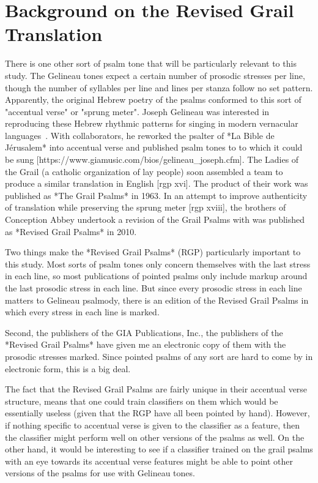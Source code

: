\documentclass[12pt]{proposal}
\begin{document}
\section{Background on the Revised Grail Translation}

There is one other sort of psalm tone that will be particularly relevant to this study.
The Gelineau tones expect a certain number of prosodic stresses per line, though the number of syllables per line and lines per stanza follow no set pattern.
Apparently, the original Hebrew poetry of the psalms conformed to this sort of "accentual verse" or "sprung meter".
Joseph Gelineau was interested in reproducing these Hebrew rhythmic patterns for singing in modern vernacular languages~\cite[p.xvi]{the_benedictine_monks_of_conception_abbey_revised_2010}.
With collaborators, he reworked the psalter of *La Bible de Jérusalem* into accentual verse and published psalm tones to to which it could be sung [https://www.giamusic.com/bios/gelineau_joseph.cfm].
The Ladies of the Grail (a catholic organization of lay people) soon assembled a team to produce a similar translation in English [rgp xvi].
The product of their work was published as *The Grail Psalms* in 1963.
In an attempt to improve authenticity of translation while preserving the sprung meter [rgp xviii], the brothers of Conception Abbey undertook a revision of the Grail Psalms with was published as *Revised Grail Psalms* in 2010.

Two things make the *Revised Grail Psalms* (RGP) particularly important to this study.
Most sorts of psalm tones only concern themselves with the last stress in each line, so most publications of pointed psalms only include markup around the last prosodic stress in each line.
But since every prosodic stress in each line matters to Gelineau psalmody, there is an edition of the Revised Grail Psalms in which every stress in each line is marked.

Second, the publishers of the GIA Publications, Inc., the publishers of the *Revised Grail Psalms* have given me an electronic copy of them with the prosodic stresses marked.
Since pointed psalms of any sort are hard to come by in electronic form, this is a big deal.

The fact that the Revised Grail Psalms are fairly unique in their accentual verse structure, means that one could train classifiers on them which would be essentially useless (given that the RGP have all been pointed by hand).
However, if nothing specific to accentual verse is given to the classifier as a feature, then the classifier might perform well on other versions of the psalms as well.
On the other hand, it would be interesting to see if a classifier trained on the grail psalms with an eye towards its accentual verse features might be able to point other versions of the psalms for use with Gelineau tones.
\end{document}
